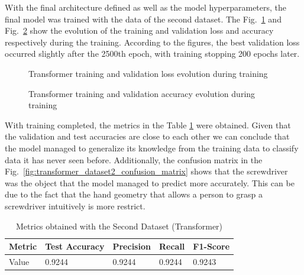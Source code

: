 With the final architecture defined as well as the model hyperparameters, the final model was trained with the data of the second dataset. The Fig.~\ref{fig:transformer_loss} and Fig.~\ref{fig:transformer_acc} show the evolution of the training and validation loss and accuracy respectively during the training. According to the figures, the best validation loss occurred slightly after the 2500th epoch, with training stopping 200 epochs later.

\begin{figure}[H]
    \centering
    {\fontsize{10}{12}\selectfont}
    \caption[Transformer training and validation loss evolution during training]{Transformer training and validation loss evolution during training}
    \label{fig:transformer_loss}
\end{figure}

\begin{figure}[H]
    \centering
    {\fontsize{10}{12}\selectfont}
    \caption[Transformer training and validation accuracy evolution during training]{Transformer training and validation accuracy evolution during training}
    \label{fig:transformer_acc}
\end{figure}

With training completed, the metrics in the Table \ref{table:transformer_dataset2_results} were obtained. Given that the validation and test accuracies are close to each other we can conclude that the model managed to generalize its knowledge from the training data to classify data it has never seen before. Additionally, the confusion matrix in the Fig.~\ref{fig:transformer_dataset2_confusion_matrix} shows that the screwdriver was the object that the model managed to predict more accurately. This can be due to the fact that the hand geometry that allows a person to grasp a screwdriver intuitively is more restrict.

\begin{table}[H]
    \centering
    \caption{Metrics obtained with the Second Dataset (Transformer)}
    \label{table:transformer_dataset2_results}
    \begin{tabular}{|l|l|l|l|l|}
        \hline
        Metric & Test Accuracy & Precision & Recall & F1-Score \\
        \hline
        Value & 0.9244 & 0.9244 & 0.9244 & 0.9243 \\
        \hline
    \end{tabular}
\end{table}

